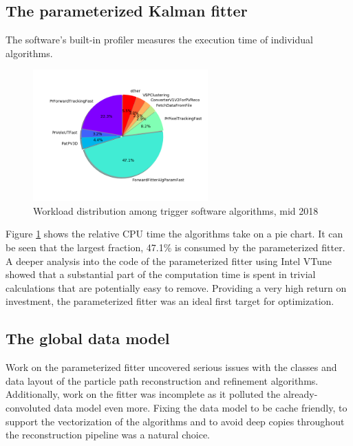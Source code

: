 \documentclass[12pt]{article}
\begin{document}
\subsection{The parameterized Kalman fitter}

The software's built-in profiler measures the execution time of individual algorithms.

\begin{figure}[H]
	\begin{center}
		\includegraphics[width=0.6\textwidth]{algo_usage_original_bestphys}
	\end{center}
	\caption{Workload distribution among trigger software algorithms, mid 2018}
	\label{fig_algo_usage_choice}
\end{figure}

Figure \ref{fig_algo_usage_choice} shows the relative CPU time the algorithms take on a pie chart. It can be seen that the largest fraction, 47.1\% is consumed by the parameterized fitter. A deeper analysis into the code of the parameterized fitter using Intel VTune showed that a substantial part of the computation time is spent in trivial calculations that are potentially easy to remove. Providing a very high return on investment, the parameterized fitter was an ideal first target for optimization.


\subsection{The global data model}

Work on the parameterized fitter uncovered serious issues with the classes and data layout of the particle path reconstruction and refinement algorithms. Additionally, work on the fitter was incomplete as it polluted the already-convoluted data model even more. Fixing the data model to be cache friendly, to support the vectorization of the algorithms and to avoid deep copies throughout the reconstruction pipeline was a natural choice.
\end{document}
